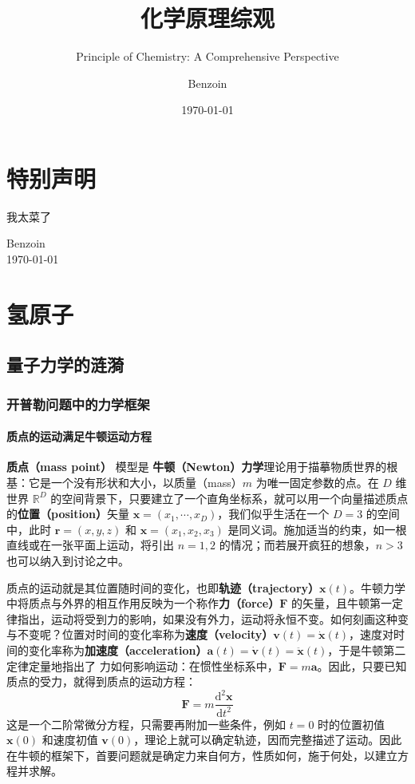 \documentclass[cn,10pt,math=newtx,citestyle=gb7714-2015,bibstyle=gb7714-2015]{elegantbook}
\title{化学原理综观}
\subtitle{Principle of Chemistry: A Comprehensive Perspective}
\author{Benzoin}
\institute{SA科学社}
\date{\today}
\def\bm{\boldsymbol}
\def\d{\mathrm d}
\def\R{\mathbb R}
\begin{document}
\maketitle
\frontmatter

\chapter*{特别声明}


我太菜了

\begin{flushright}
Benzoin\\
\today
\end{flushright}

\tableofcontents

\mainmatter

\chapter{氢原子}
\section{量子力学的涟漪}
\subsection{开普勒问题中的力学框架}
\subsubsection{质点的运动满足牛顿运动方程}
\textbf{质点（mass point）} 模型是 \textbf{牛顿（Newton）力学}理论用于描摹物质世界的根基：它是一个没有形状和大小，以质量（mass）$m$ 为唯一固定参数的点。在 $D$ 维世界 $\R^D$ 的空间背景下，只要建立了一个直角坐标系，就可以用一个向量描述质点的\textbf{位置（position）}矢量 $\bm x=(x_1,\cdots,x_D)$，我们似乎生活在一个 $D=3$ 的空间中，此时 $\bm r=(x,y,z)$ 和 $\bm x=(x_1,x_2,x_3)$ 是同义词。施加适当的约束，如一根直线或在一张平面上运动，将引出 $n=1,2$  的情况；而若展开疯狂的想象，$n>3$ 也可以纳入到讨论之中。

质点的运动就是其位置随时间的变化，也即\textbf{轨迹（trajectory）}$\bm x(t)$。牛顿力学中将质点与外界的相互作用反映为一个称作\textbf{力（force）}$\bm F$ 的矢量，且牛顿第一定律指出，运动将受到力的影响，如果没有外力，运动将永恒不变。如何刻画这种变与不变呢？位置对时间的变化率称为\textbf{速度（velocity）}$\bm v(t)=\dot{\bm x}(t)$，速度对时间的变化率称为\textbf{加速度（acceleration）}$\bm a(t)=\dot{\bm v}(t)=\ddot{\bm x}(t)$，于是牛顿第二定律定量地指出了
力如何影响运动：在惯性坐标系中，$\bm F=m\bm a$。因此，只要已知质点的受力，就得到质点的运动方程：
\begin{equation}\label{eq:Nwtn_2}
    \bm F = m\frac{\d^2 \bm x}{\d t^2}
\end{equation}
这是一个二阶常微分方程，只需要再附加一些条件，例如 $t=0$ 时的位置初值 $\bm x(0)$ 和速度初值 $\bm v(0)$，理论上就可以确定轨迹，因而完整描述了运动。因此在牛顿的框架下，首要问题就是确定力来自何方，性质如何，施于何处，以建立方程并求解。
\end{document}
